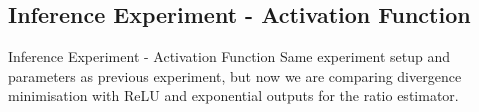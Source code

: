 \documentclass{beamer}
\begin{document}
\subsection{Inference Experiment - Activation Function}
\begin{frame}{Inference Experiment - Activation Function}
Same experiment setup and parameters as previous experiment, but now we are comparing divergence minimisation with ReLU and exponential outputs for the ratio estimator.
\begin{table}[h]
\end{table}
\end{frame}
\end{document}
